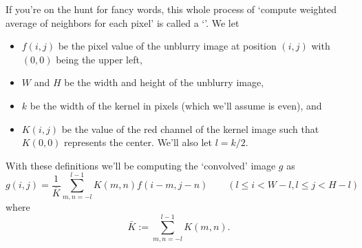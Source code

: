 If you're on the hunt for fancy words, this whole process of `compute
weighted average of neighbors for each pixel' is called a
`'.
We let
\begin{itemize}
  \item $f(i,j)$ be the pixel value of the unblurry image at position $(i,j)$ with $(0,0)$
    being the upper left,
  \item $W$ and $H$ be the width and height of the unblurry image,
  \item $k$ be the width of the kernel in pixels (which
    we'll assume is even), and
  \item $K(i,j)$ be the value of the red channel of the
    kernel image such that $K(0,0)$ represents the center.
    We'll also let $l=k/2$.
\end{itemize}
With these definitions we'll be computing the `convolved' image $g$ as
\[
  g(i,j)=\frac{1}{\bar K} \sum_{m,n=-l}^{l-1} K(m,n)f(i-m,j-n)
  \qquad
  (l\le i <W-l,l\le j<H-l)
\]
where
\[
  \bar K:=\sum_{m,n=-l}^{l-1} K(m,n).
\]
